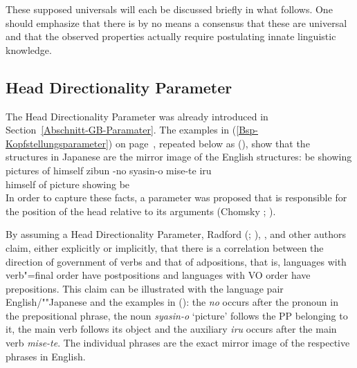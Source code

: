 \noindent
These supposed universals will each be discussed briefly in what follows. One should emphasize that there is by no means
a consensus that these are universal and that the observed properties actually require postulating innate linguistic
knowledge.

\subsection{Head Directionality Parameter}
\label{Abschnitt-Kopfstellungsparameter}

\mbox{}%
The Head Directionality Parameter was already introduced in Section~\ref{Abschnitt-GB-Paramater}. The examples in (\ref{Bsp-Kopfstellungsparameter}) on
page~\pageref{Bsp-Kopfstellungsparameter}, repeated below as (), show that the structures in Japanese are the mirror image of the English structures:
\eal
\label{Bsp-Kopfstellungsparameter-zwei}
\ex 
be showing pictures of himself
\ex
\gll zibun  -no syasin-o mise-te iru\\
     himself of picture showing be\\
\zl
In order to capture these facts, a parameter was proposed that is responsible for the position of the head relative to its
arguments (\eg Chomsky \citeyear[]{Chomsky86}; \citeyear[]{Chomsky88a-u}). 

By assuming a Head Directionality Parameter, Radford (\citeyear[--61]{Radford90a-u}; \citeyear[--22]{Radford97a-u}), \citet[, 238]{Pinker94a}, \citet[]{Baker2003b}
and other authors claim, either explicitly or implicitly, that there is a correlation between the direction of government of verbs and that of adpositions, that is, languages
with verb"=final order have postpositions and languages with VO order have prepositions. This claim
can be illustrated with the language pair English/""Japanese and the
examples in (): the \emph{no} occurs after the pronoun in the prepositional phrase, the noun \emph{syasin-o} `picture' follows the PP belonging to it, the main verb follows its object and the
auxiliary \emph{iru} occurs after the main verb \emph{mise-te}. The individual phrases are the exact mirror image of
the respective phrases in English.

